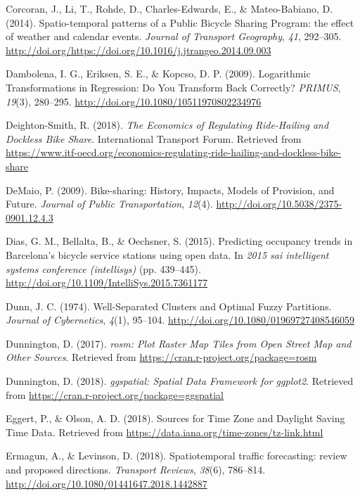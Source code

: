 \documentclass[12pt,oneside]{reedthesis}
\begin{document}
\hypertarget{ref-corcoran2014}{}
Corcoran, J., Li, T., Rohde, D., Charles-Edwards, E., \& Mateo-Babiano,
D. (2014). Spatio-temporal patterns of a Public Bicycle Sharing Program:
the effect of weather and calendar events. \emph{Journal of Transport
Geography}, \emph{41}, 292--305.
\url{http://doi.org/https://doi.org/10.1016/j.jtrangeo.2014.09.003}

\hypertarget{ref-dambolena2009}{}
Dambolena, I. G., Eriksen, S. E., \& Kopcso, D. P. (2009). Logarithmic
Transformations in Regression: Do You Transform Back Correctly?
\emph{PRIMUS}, \emph{19}(3), 280--295.
\url{http://doi.org/10.1080/10511970802234976}

\hypertarget{ref-itf2018}{}
Deighton-Smith, R. (2018). \emph{The Economics of Regulating
Ride-Hailing and Dockless Bike Share}. International Transport Forum.
Retrieved from
\url{https://www.itf-oecd.org/economics-regulating-ride-hailing-and-dockless-bike-share}

\hypertarget{ref-demaio2009}{}
DeMaio, P. (2009). Bike-sharing: History, Impacts, Models of Provision,
and Future. \emph{Journal of Public Transportation}, \emph{12}(4).
\url{http://doi.org/10.5038/2375-0901.12.4.3}

\hypertarget{ref-dias2015}{}
Dias, G. M., Bellalta, B., \& Oechsner, S. (2015). Predicting occupancy
trends in Barcelona's bicycle service stations using open data. In
\emph{2015 sai intelligent systems conference (intellisys)} (pp.
439--445). \url{http://doi.org/10.1109/IntelliSys.2015.7361177}

\hypertarget{ref-dunn1974}{}
Dunn, J. C. (1974). Well-Separated Clusters and Optimal Fuzzy
Partitions. \emph{Journal of Cybernetics}, \emph{4}(1), 95--104.
\url{http://doi.org/10.1080/01969727408546059}

\hypertarget{ref-rosm}{}
Dunnington, D. (2017). \emph{rosm: Plot Raster Map Tiles from Open
Street Map and Other Sources}. Retrieved from
\url{https://cran.r-project.org/package=rosm}

\hypertarget{ref-ggspatial}{}
Dunnington, D. (2018). \emph{ggspatial: Spatial Data Framework for
ggplot2}. Retrieved from
\url{https://cran.r-project.org/package=ggspatial}

\hypertarget{ref-tz}{}
Eggert, P., \& Olson, A. D. (2018). Sources for Time Zone and Daylight
Saving Time Data. Retrieved from
\url{https://data.iana.org/time-zones/tz-link.html}

\hypertarget{ref-ermagun2018}{}
Ermagun, A., \& Levinson, D. (2018). Spatiotemporal traffic forecasting:
review and proposed directions. \emph{Transport Reviews}, \emph{38}(6),
786--814. \url{http://doi.org/10.1080/01441647.2018.1442887}
\end{document}
